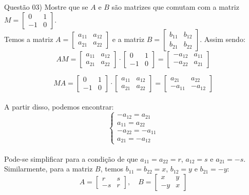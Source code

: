 \newcommand{\mAA}{
    \begin{bmatrix}
        a_{11} & a_{12} \\
        a_{21} & a_{22}
    \end{bmatrix}
}
\newcommand{\mBB}{
    \begin{bmatrix}
        b_{11} & b_{12} \\
        b_{21} & b_{22}
    \end{bmatrix}
}
\newcommand{\mM}{
    \begin{bmatrix}
        0  & 1 \\
        -1 & 0
    \end{bmatrix}
}

\noindent \textcolor{COLOR1}{Questão 03)} Mostre que se $A$ e $B$ são matrizes que comutam com a matriz $M=\mM$.
\\

Temos a matriz $A = \mAA$ e a matriz $B = \mBB$. Assim sendo:
\\

\[
    AM = \mAA \cdot \mM =
    \begin{bmatrix}
        -a_{12} & a_{11} \\
        -a_{22} & a_{21}
    \end{bmatrix}
\]


\[
    MA = \mM \cdot \mAA =
    \begin{bmatrix}
        a_{21}  & a_{22}  \\
        -a_{11} & -a_{12}
    \end{bmatrix}
\]
\\

A partir disso, podemos encontrar:
\\

\[
    \begin{cases}
        -a_{12} = a_{21}  \\
        a_{11} = a_{22}   \\
        -a_{22} = -a_{11} \\
        a_{21} = -a_{12}
    \end{cases}
\]
\\

Pode-se simplificar para a condição de que $a_{11} = a_{22} = r$, $a_{12} = s$ e $a_{21} = -s$. Similarmente, para a matriz $B$, temos $b_{11} = b_{22} = x$, $b_{12} = y$ e $b_{21} = -y$:
\\

\[
    A =
    \begin{bmatrix}
        r  & s \\
        -s & r
    \end{bmatrix},\hspace{1em}
    B =
    \begin{bmatrix}
        x  & y \\
        -y & x
    \end{bmatrix}
\]
\\

